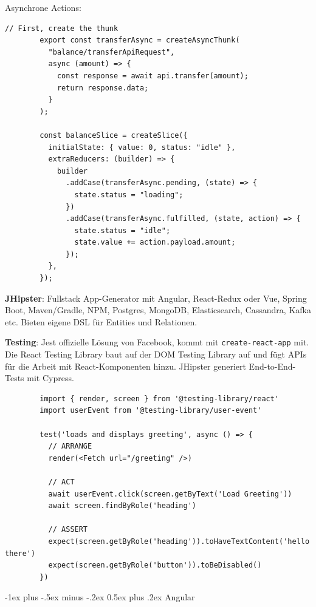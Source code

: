 \documentclass[10pt,landscape]{article}
\makeatletter
\renewcommand{\section}{\@startsection{section}{1}{0mm}%
{-1ex plus -.5ex minus -.2ex}%
{0.5ex plus .2ex}%
{\normalfont\large\bfseries}}
\makeatother
\begin{document}
\begin{multicols}{2}
        Asynchrone Actions:

        \begin{lstlisting}[belowskip=-0.8 \baselineskip]
        // First, create the thunk
        export const transferAsync = createAsyncThunk(
          "balance/transferApiRequest",
          async (amount) => {
            const response = await api.transfer(amount);
            return response.data;
          }
        );

        const balanceSlice = createSlice({
          initialState: { value: 0, status: "idle" },
          extraReducers: (builder) => {
            builder
              .addCase(transferAsync.pending, (state) => {
                state.status = "loading";
              })
              .addCase(transferAsync.fulfilled, (state, action) => {
                state.status = "idle";
                state.value += action.payload.amount;
              });
          },
        });
        \end{lstlisting}

        \textbf{JHipster}: Fullstack App-Generator mit Angular, React-Redux oder Vue, Spring Boot, Maven/Gradle, NPM, Postgres, MongoDB, Elasticsearch, Cassandra, Kafka etc.
        Bieten eigene DSL für Entities und Relationen.

        \textbf{Testing}: Jest offizielle Lösung von Facebook, kommt mit \lstinline{create-react-app} mit.
        Die React Testing Library baut auf der DOM Testing Library auf und fügt APIs für die Arbeit mit React-Komponenten hinzu.
        JHipster generiert End-to-End-Tests mit Cypress.

        \begin{lstlisting}
        import { render, screen } from '@testing-library/react'
        import userEvent from '@testing-library/user-event'

        test('loads and displays greeting', async () => {
          // ARRANGE
          render(<Fetch url="/greeting" />)

          // ACT
          await userEvent.click(screen.getByText('Load Greeting'))
          await screen.findByRole('heading')

          // ASSERT
          expect(screen.getByRole('heading')).toHaveTextContent('hello there')
          expect(screen.getByRole('button')).toBeDisabled()
        })
        \end{lstlisting}


        \section{Angular}


\end{multicols}
\end{document}
